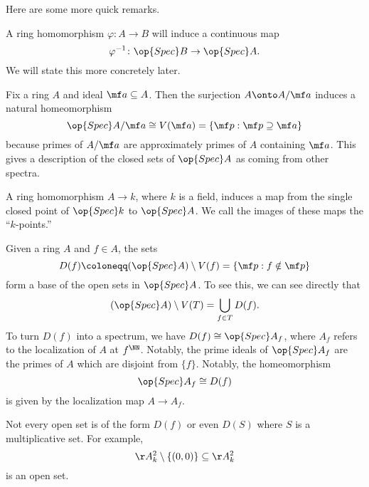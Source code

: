 \documentclass[../notes.tex]{subfiles}
\begin{document}
Here are some more quick remarks.
\begin{remark}
	A ring homomorphism $\varphi\colon A\to B$ will induce a continuous map
	\[\varphi^{-1}\colon\op{Spec}B\to\op{Spec}A.\]
	We will state this more concretely later.
\end{remark}
\begin{example}
	Fix a ring $A$ and ideal $\mf a\subseteq A$. Then the surjection $A\onto A/\mf a$ induces a natural homeomorphism
	\[\op{Spec}A/\mf a\cong V(\mf a)=\{\mf p:\mf p\supseteq\mf a\}\]
	because primes of $A/\mf a$ are approximately primes of $A$ containing $\mf a$. This gives a description of the closed sets of $\op{Spec}A$ as coming from other spectra.
\end{example}
\begin{example}
	A ring homomorphism $A\to k$, where $k$ is a field, induces a map from the single closed point of $\op{Spec}k$ to $\op{Spec}A$. We call the images of these maps the ``$k$-points.''
\end{example}
\begin{example}
	Given a ring $A$ and $f\in A$, the sets
	\[D(f)\coloneqq(\op{Spec}A)\setminus V(f)=\{\mf p:f\notin\mf p\}\]
	form a base of the open sets in $\op{Spec}A$. To see this, we can see directly that
	\[(\op{Spec}A)\setminus V(T)=\bigcup_{f\in T}D(f).\]
	To turn $D(f)$ into a spectrum, we have $D(f)\cong\op{Spec}A_f$, where $A_f$ refers to the localization of $A$ at $f^\NN$. Notably, the prime ideals of $\op{Spec}A_f$ are the primes of $A$ which are disjoint from $\{f\}$. Notably, the homeomorphism
	\[\op{Spec}A_f\cong D(f)\]
	is given by the localization map $A\to A_f$.
\end{example}
\begin{remark}
	Not every open set is of the form $D(f)$ or even $D(S)$ where $S$ is a multiplicative set. For example,
	\[\AA^2_k\setminus\{(0,0)\}\subseteq\AA^2_k\]
	is an open set.
\end{remark}
\end{document}

